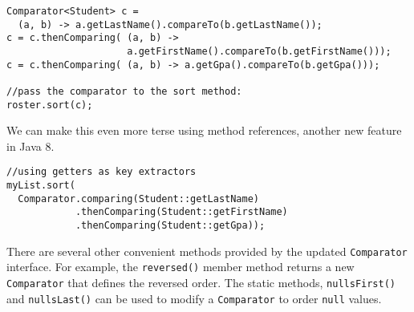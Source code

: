 \begin{verbatim}
Comparator<Student> c = 
  (a, b) -> a.getLastName().compareTo(b.getLastName());
c = c.thenComparing( (a, b) -> 
                     a.getFirstName().compareTo(b.getFirstName()));
c = c.thenComparing( (a, b) -> a.getGpa().compareTo(b.getGpa()));

//pass the comparator to the sort method:
roster.sort(c);
\end{verbatim}

We can make this even more terse using method references, another
new feature in Java 8.

\begin{verbatim}
//using getters as key extractors 
myList.sort(
  Comparator.comparing(Student::getLastName)
            .thenComparing(Student::getFirstName)
            .thenComparing(Student::getGpa));
\end{verbatim}

There are several other convenient methods provided by the updated
\texttt{Comparator} interface.  For example, 
the \texttt{reversed()} member method returns a new
\texttt{Comparator} that defines the reversed order.
The static methods, \texttt{nullsFirst()} and 
\texttt{nullsLast()} can be used to modify a 
\texttt{Comparator} to order \texttt{null}
values.
